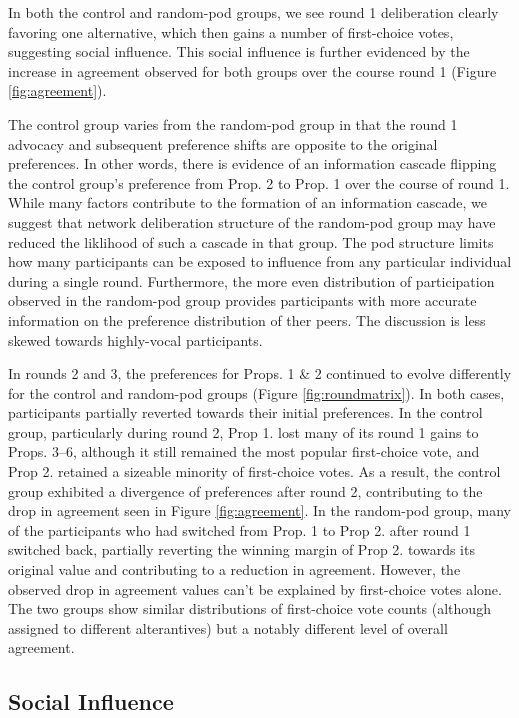 {In both the control and random-pod groups, we see round 1 deliberation clearly favoring one alternative, which then gains a number of first-choice votes, suggesting social influence.
This social influence is further evidenced by the increase in agreement observed for both groups over the course round 1 (Figure \ref{fig:agreement}).

The control group varies from the random-pod group in that the round 1 advocacy and subsequent preference shifts are opposite to the original preferences.
In other words, there is evidence of an information cascade flipping the control group's preference from Prop. 2 to Prop. 1 over the course of round 1.
While many factors contribute to the formation of an information cascade, we suggest that network deliberation structure of the random-pod group may have reduced the liklihood of such a cascade in that group.
The pod structure limits how many participants can be exposed to influence from any particular individual during a single round.
Furthermore, the more even distribution of participation observed in the random-pod group provides participants with more accurate information on the preference distribution of ther peers.
The discussion is less skewed towards highly-vocal participants.

In rounds 2 and 3, the preferences for Props. 1 \& 2 continued to evolve differently for the control and random-pod groups (Figure \ref{fig:roundmatrix}).
In both cases, participants partially reverted towards their initial preferences.
In the control group, particularly during round 2, Prop 1. lost many of its round 1 gains to Props. 3--6, although it still remained the most popular first-choice vote,
and Prop 2. retained a sizeable minority of first-choice votes.
As a result, the control group exhibited a divergence of preferences after round 2, contributing to the drop in agreement seen in Figure \ref{fig:agreement}.
In the random-pod group, many of the participants who had switched from Prop. 1 to Prop 2. after round 1 switched back,
partially reverting the winning margin of Prop 2. towards its original value and contributing to a reduction in agreement.
However, the observed drop in agreement values can't be explained by first-choice votes alone.
The two groups show similar distributions of first-choice vote counts (although assigned to different alterantives) but a notably different level of overall agreement.

\subsection{Social Influence}
\label{sec:res-socialinfluence}

}
